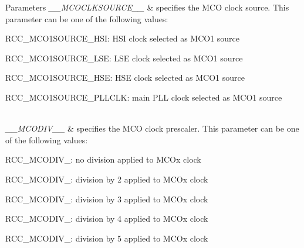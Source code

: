 \begin{DoxyParams}{Parameters}
{\em \+\_\+\+\_\+\+M\+C\+O\+C\+L\+K\+S\+O\+U\+R\+C\+E\+\_\+\+\_\+} & specifies the M\+CO clock source. This parameter can be one of the following values\+: \begin{DoxyItemize}
\item R\+C\+C\+\_\+\+M\+C\+O1\+S\+O\+U\+R\+C\+E\+\_\+\+H\+SI\+: H\+SI clock selected as M\+C\+O1 source \item R\+C\+C\+\_\+\+M\+C\+O1\+S\+O\+U\+R\+C\+E\+\_\+\+L\+SE\+: L\+SE clock selected as M\+C\+O1 source \item R\+C\+C\+\_\+\+M\+C\+O1\+S\+O\+U\+R\+C\+E\+\_\+\+H\+SE\+: H\+SE clock selected as M\+C\+O1 source \item R\+C\+C\+\_\+\+M\+C\+O1\+S\+O\+U\+R\+C\+E\+\_\+\+P\+L\+L\+C\+LK\+: main P\+LL clock selected as M\+C\+O1 source \end{DoxyItemize}
\\
\hline
{\em \+\_\+\+\_\+\+M\+C\+O\+D\+I\+V\+\_\+\+\_\+} & specifies the M\+CO clock prescaler. This parameter can be one of the following values\+: \begin{DoxyItemize}
\item R\+C\+C\+\_\+\+M\+C\+O\+D\+I\+V\+\_\+: no division applied to M\+C\+Ox clock \item R\+C\+C\+\_\+\+M\+C\+O\+D\+I\+V\+\_\+: division by 2 applied to M\+C\+Ox clock \item R\+C\+C\+\_\+\+M\+C\+O\+D\+I\+V\+\_\+: division by 3 applied to M\+C\+Ox clock \item R\+C\+C\+\_\+\+M\+C\+O\+D\+I\+V\+\_\+: division by 4 applied to M\+C\+Ox clock \item R\+C\+C\+\_\+\+M\+C\+O\+D\+I\+V\+\_\+: division by 5 applied to M\+C\+Ox clock \end{DoxyItemize}
\\
\hline
\end{DoxyParams}
\mbox{\label{group___r_c_c_ex___m_c_ox___clock___config_gabb7360422910dd65312786fc49722d25}} 
